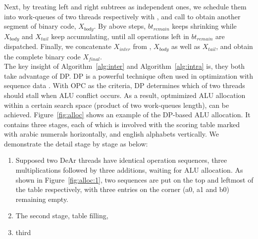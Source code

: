Next, by treating left and right subtrees as independent ones, 
we schedule them into work-queues of two threads respectively with ,
and call  to obtain another segment of binary code, $X_{body}$.
By above steps, $bt_{remain}$ keeps shrinking while $X_{body}$ and $X_{tail}$ keep accumulating,
until all operations left in $bt_{remain}$ are dispatched.
Finally, we concatenate $X_{inter}$ from , $X_{body}$ as well as $X_{tail}$,
and obtain the complete binary code $X_{final}$.
\\\indent
The key insight of Algorithm~\ref{alg:inter} and Algorithm~\ref{alg:intra} is, they both take advantage of DP.
DP is a powerful technique often used in optimization with sequence data \cite{dpseq}.
With OPC as the criteria, DP determines which of two threads should stall when ALU conflict occurs.
As a result, optmimized ALU allocation within a certain search space (product of two work-queues length), can be achieved.
Figure~\ref{fig:alloc} shows an example of the DP-based ALU allocation.
It contains three stages, each of which is involved with the scoring table marked with arabic numerals horizontally, and english alphabets vertically.
We demonstrate the detail stage by stage as below:
\begin{enumerate}
    \item Supposed two DeAr threads have identical operation sequences, three multiplications followed by three additions, waiting for ALU allocation.
        As shown in Figure~\ref{fig:alloc:1}, two sequences are put on the top and leftmost of the table respectively, 
        with three entries on the corner (a0, a1 and b0) remaining empty.
           \item The second stage, table filling, 
           \item third
\end{enumerate}

